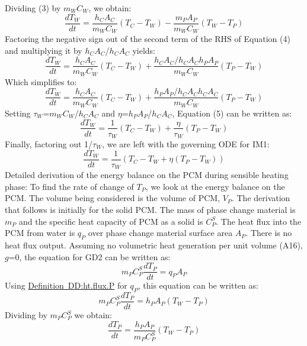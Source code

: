 \documentclass[12pt]{article}
\begin{document}
Dividing (3) by $m_{W}$$C_{W}$, we obtain:
\begin{equation}
\frac{dT_{W}}{dt}=\frac{h_{C}A_{C}}{m_{W}C_{W}}(T_{C}-T_{W})-\frac{m_{P}A_{P}}{m_{W}C_{W}}(T_{W}-T_{P})
\end{equation}
Factoring the negative sign out of the second term of the RHS of Equation (4) and multiplying it by $h_{C}$$A_{C}$/$h_{C}$$A_{C}$ yields:
\begin{equation}
\frac{dT_{W}}{dt}=\frac{h_{C}A_{C}}{m_{W}C_{W}}(T_{C}-T_{W})+\frac{h_{C}A_{C}/h_{C}A_{C}h_{P}A_{P}}{m_{W}C_{W}}(T_{P}-T_{W})
\end{equation}
Which simplifies to:
\begin{equation}
\frac{dT_{W}}{dt}=\frac{h_{C}A_{C}}{m_{W}C_{W}}(T_{C}-T_{W})+\frac{h_{P}A_{P}/h_{C}A_{C}h_{C}A_{C}}{m_{W}C_{W}}(T_{P}-T_{W})
\end{equation}
Setting $\tau{}_{W}$=$m_{W}$$C_{W}$/$h_{C}$$A_{C}$ and $\eta{}$=$h_{P}$$A_{P}$/$h_{C}$$A_{C}$, Equation (5) can be written as:
\begin{equation}
\frac{dT_{W}}{dt}=\frac{1}{\tau{}_{W}}(T_{C}-T_{W})+\frac{\eta{}}{\tau{}_{W}}(T_{P}-T_{W})
\end{equation}
Finally, factoring out 1/$\tau{}_{W}$, we are left with the governing ODE for IM1:
\begin{equation}
\frac{dT_{W}}{dt}=\frac{1}{\tau{}_{W}}(T_{C}-T_{W}+\eta{}(T_{P}-T_{W}))
\end{equation}
Detailed derivation of the energy balance on the PCM during sensible heating phase:
To find the rate of change of $T_{P}$, we look at the energy balance on the PCM. The volume being considered is the volume of PCM, $V_{P}$. The derivation that follows is initially for the solid PCM. The mass of phase change material is $m_{P}$ and the specific heat capacity of PCM as a solid is $C_{P}^{S}$. The heat flux into the PCM from water is $q_{P}$ over phase change material surface area $A_{P}$. There is no heat flux output. Assuming no volumetric heat generation per unit volume (A16), $g$=0, the equation for GD2 can be written as:
\begin{equation}
m_{P}C_{P}^{S}\frac{dT_{P}}{dt}=q_{P}A_{P}
\end{equation}
Using \hyperref[DD:ht.flux.P]{Definition~DD:ht.flux.P} for $q_{P}$, this equation can be written as:
\begin{equation}
m_{P}C_{P}^{S}\frac{dT_{P}}{dt}=h_{P}A_{P}(T_{W}-T_{P})
\end{equation}
Dividing by $m_{P}$$C_{P}^{S}$ we obtain:
\begin{equation}
\frac{dT_{P}}{dt}=\frac{h_{P}A_{P}}{m_{P}C_{P}^{S}}(T_{W}-T_{P})
\end{equation}
\end{document}
